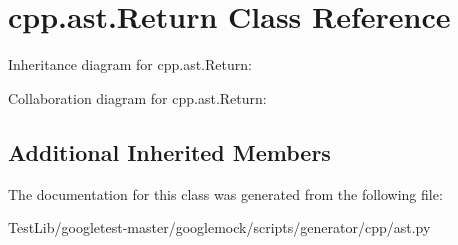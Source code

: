 \hypertarget{classcpp_1_1ast_1_1Return}{}\section{cpp.\+ast.\+Return Class Reference}
\label{classcpp_1_1ast_1_1Return}


Inheritance diagram for cpp.\+ast.\+Return\+:


Collaboration diagram for cpp.\+ast.\+Return\+:
\subsection*{Additional Inherited Members}


The documentation for this class was generated from the following file\+:\begin{DoxyCompactItemize}
\item 
Test\+Lib/googletest-\/master/googlemock/scripts/generator/cpp/ast.\+py\end{DoxyCompactItemize}
